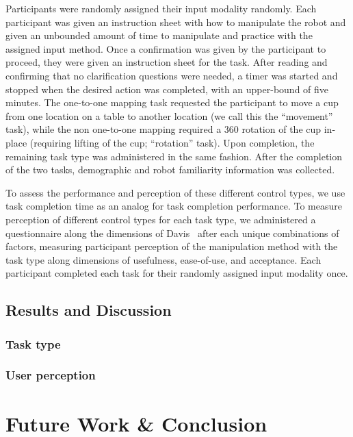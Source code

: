 \documentclass{sigchi}
\begin{document}
Participants were randomly assigned their input modality randomly.  Each participant was given an instruction sheet with how to manipulate the robot and given an unbounded amount of time to manipulate and practice with the assigned input method.  Once a confirmation was given by the participant to proceed, they were given an instruction sheet for the task.  After reading and confirming that no clarification questions were needed, a timer was started and stopped when the desired action was completed, with an upper-bound of five minutes.  The one-to-one mapping task requested the participant to move a cup from one location on a table to another location (we call this the ``movement'' task), while the non one-to-one mapping required a 360 rotation of the cup in-place (requiring lifting of the cup; ``rotation'' task).  Upon completion, the remaining task type was administered in the same fashion.  After the completion of the two tasks, demographic and robot familiarity information was collected.

To assess the performance and perception of these different control types, we use task completion time as an analog for task completion performance.  To measure perception of different control types for each task type, we administered a questionnaire along the dimensions of Davis~\cite{Davis1989} after each unique combinations of factors, measuring participant perception of the manipulation method with the task type along dimensions of usefulness, ease-of-use, and acceptance.  Each participant completed each task for their randomly assigned input modality once. 


\subsection{Results and Discussion}
\subsubsection{Task type}



\subsubsection{User perception}



\section{Future Work \& Conclusion}
\end{document}
